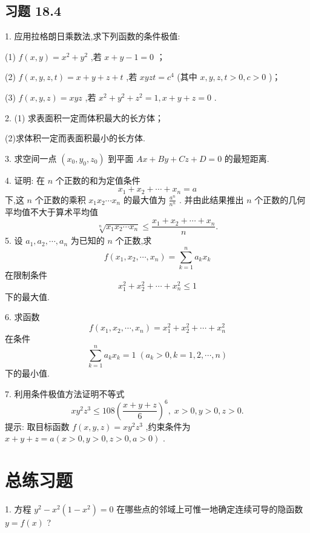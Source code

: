 \subsection{习题 18.4}

1. 应用拉格朗日乘数法,求下列函数的条件极值:

(1) \(f\left( {x,y}\right)  = {x}^{2} + {y}^{2}\) ,若 \(x + y - 1 = 0\) ；

(2) \(f\left( {x,y,z,t}\right)  = x + y + z + t\) ,若 \({xyzt} = {c}^{4}\) (其中 \(x,y,z,t > 0,c > 0\) )；

(3) \(f\left( {x,y,z}\right)  = {xyz}\) ,若 \({x}^{2} + {y}^{2} + {z}^{2} = 1,x + y + z = 0\) .

2. (1) 求表面积一定而体积最大的长方体；

(2)求体积一定而表面积最小的长方体.

3. 求空间一点 \(\left( {{x}_{0},{y}_{0},{z}_{0}}\right)\) 到平面 \({Ax} + {By} + {Cz} + D = 0\) 的最短距离.

4. 证明: 在 \(n\) 个正数的和为定值条件
\[
{x}_{1} + {x}_{2} + \cdots  + {x}_{n} = a
\]
下,这 \(n\) 个正数的乘积 \({x}_{1}{x}_{2}\cdots {x}_{n}\) 的最大值为 \(\frac{{a}^{n}}{{n}^{n}}\) . 并由此结果推出 \(n\) 个正数的几何平均值不大于算术平均值
\[
\sqrt[n]{{x}_{1}{x}_{2}\cdots {x}_{n}} \leq  \frac{{x}_{1} + {x}_{2} + \cdots  + {x}_{n}}{n}.
\]
5. 设 \({a}_{1},{a}_{2},\cdots ,{a}_{n}\) 为已知的 \(n\) 个正数,求
\[
f\left( {{x}_{1},{x}_{2},\cdots ,{x}_{n}}\right)  = \mathop{\sum }\limits_{{k = 1}}^{n}{a}_{k}{x}_{k}
\]
在限制条件
\[
{x}_{1}^{2} + {x}_{2}^{2} + \cdots  + {x}_{n}^{2} \leq  1
\]
下的最大值.

6. 求函数
\[
f\left( {{x}_{1},{x}_{2},\cdots ,{x}_{n}}\right)  = {x}_{1}^{2} + {x}_{2}^{2} + \cdots  + {x}_{n}^{2}
\]
在条件
\[
\mathop{\sum }\limits_{{k = 1}}^{n}{a}_{k}{x}_{k} = 1\;\left( {{a}_{k} > 0,k = 1,2,\cdots ,n}\right)
\]
下的最小值.

7. 利用条件极值方法证明不等式
\[
x{y}^{2}{z}^{3} \leq  {108}{\left( \frac{x + y + z}{6}\right) }^{6},\;x > 0,y > 0,z > 0.
\]
提示: 取目标函数 \(f\left( {x,y,z}\right)  = x{y}^{2}{z}^{3}\) ,约束条件为 \(x + y + z = a\left( {x > 0,y > 0,z > 0,a > 0}\right)\) .

\section{总练习题}

1. 方程 \({y}^{2} - {x}^{2}\left( {1 - {x}^{2}}\right)  = 0\) 在哪些点的邻域上可惟一地确定连续可导的隐函数 \(y = f\left( x\right)\) ?

